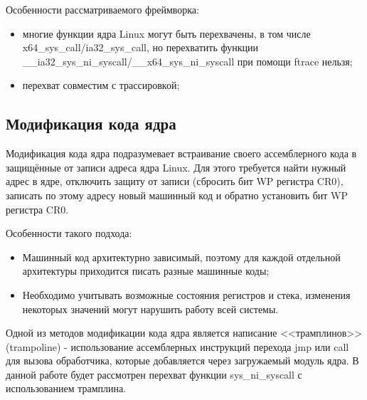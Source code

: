 \documentclass{bmstu}
\begin{document}
Особенности рассматриваемого фреймворка:

\begin{itemize}
	\item многие функции ядра Linux могут быть перехвачены, в том числе x64\_sys\_call/ia32\_sys\_call, но перехватить функции \_\_ia32\_sys\_ni\_syscall/\_\_x64\_sys\_ni\_syscall при помощи ftrace нельзя;
	\item перехват совместим с трассировкой;
\end{itemize}

\subsection{Модификация кода ядра} %
Модификация кода ядра подразумевает встраивание своего ассемблерного кода в защищённые от записи адреса ядра Linux. Для этого требуется найти нужный адрес в ядре, отключить защиту от записи (сбросить бит WP регистра CR0), записать по этому адресу новый машинный код и обратно установить бит WP регистра CR0.

Особенности такого подхода:
\begin{itemize}
	\item Машинный код архитектурно зависимый, поэтому для каждой отдельной архитектуры приходится писать разные машинные коды;
	\item Необходимо учитывать возможные состояния регистров и стека, изменения некоторых значений могут нарушить работу всей системы.
\end{itemize}
Одной из методов модификации кода ядра является написание <<трамплинов>> (trampoline) - использование ассемблерных инструкций перехода jmp или call для вызова обработчика, которые добавляется через загружаемый модуль ядра. В данной работе будет рассмотрен перехват функции sys\_ni\_syscall с использованием трамплина.
\end{document}
